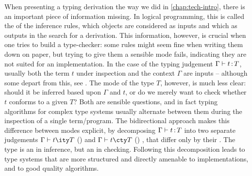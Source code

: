 
When presenting a typing derivation the way we did in \cref{chap:tech-intro}, there is
an important piece of information missing.
In logical programming, this is called the  of the inference rules,
\ie which objects are considered as inputs and which as outputs in the search
for a derivation.
This information, however, is crucial when one tries to build a type-checker:
some rules might seem fine when writing them down on paper, but trying to give them a
sensible mode fails, indicating they are not suited for an implementation.
In the case of the typing judgement $\Gamma \vdash t \operatorname{\mathrel{:}} T$,
usually both the term $t$ under inspection and the context $\Gamma$ are inputs –
although some depart from this, see .
The mode of the type $T$, however, is much less clear: should it be inferred based upon
$\Gamma$ and $t$, or do we merely want to check whether $t$ conforms to a given $T$?
Both are sensible questions, and in fact typing algorithms for complex type systems usually 
alternate between them during the inspection of a single term/program.
\AP The bidirectional approach makes this difference between modes explicit,
by decomposing %
$\Gamma \vdash t \operatorname{\mathrel{:}} T$ into two separate judgements $\inferty{\Gamma}{t}{T}$
() and $\checkty{\Gamma}{t}{T}$ ()%
,
that differ only by their . The type is an
 in inference, but an  in checking.
Following this decomposition%
%
%
leads to type systems that are more structured and directly amenable to implementations,
and to good quality algorithms.%

